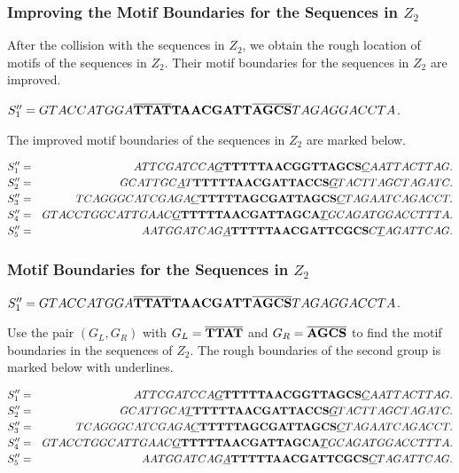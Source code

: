 \documentclass[11pt]{article}
\begin{document}
\subsubsection{Improving the Motif Boundaries for the Sequences in $Z_2$}

After the collision with the sequences in $Z_2$, we obtain the rough
location of motifs of the sequences in $Z_2$. Their motif boundaries
for the sequences in $Z_2$ are improved.

$S_1''=GTACCATGGA{\Large\bf \overline{TTAT}T
AACGATT\overline{AGCS}}TAGAGGACCTA$.

The improved motif boundaries of the sequences in $Z_2$ are marked
below.

\begin{eqnarray*}
S_1''&=&ATTCGATCCA\underline{G}{\Large\bf
TTTTTAACG{\small{G}}TTAGCS}\underline{C}AATTACTTAG.\\
S_2''&=&GCATTGC\underline{A}T{\Large\bf
TTTTTAACGATTACCS}\underline{G}TACTTAGCTAGATC.\\
S_3''&=&TCAGGGCATCGAGA\underline{C}{\Large\bf TTTTTAGCGATTAGCS}\underline{C}TAGAATCAGACCT.\\
S_4''&=&GTACCTGGCATTGAAC\underline{G}{\Large\bf TTTTTAACGATTAGCA}\underline{T}GCAGATGGACCTTTA.\\
S_5''&=&AATGGATCAG\underline{A}{\Large\bf
TTTTTAACGATTCGCS}C\underline{T}AGATTCAG.
\end{eqnarray*}

\subsubsection{Motif Boundaries for the Sequences in $Z_2$}

$S_1''=GTACCATGGA{\Large\bf \overline{TTAT}T
AACGATT\overline{AGCS}}TAGAGGACCTA$.

Use the pair $(G_L,G_R)$ with $G_L={\Large\bf \overline{TTAT}}$ and
$G_R={\Large\bf\overline{AGCS}}$ to find the motif boundaries in the
sequences of $Z_2$. The rough boundaries of the second group is
marked below with underlines.





\begin{eqnarray*}
S_1''&=&ATTCGATCCA\underline{G}{\Large\bf
TTTTTAACG{\small{G}}TTAGCS}\underline{C}AATTACTTAG.\\
S_2''&=&GCATTGCA\underline{T}{\Large\bf
TTTTTAACGATTACCS}\underline{G}TACTTAGCTAGATC.\\
S_3''&=&TCAGGGCATCGAGA\underline{C}{\Large\bf TTTTTAGCGATTAGCS}\underline{C}TAGAATCAGACCT.\\
S_4''&=&GTACCTGGCATTGAAC\underline{G}{\Large\bf TTTTTAACGATTAGCA}\underline{T}GCAGATGGACCTTTA.\\
S_5''&=&AATGGATCAG\underline{A}{\Large\bf
TTTTTAACGATTCGCS}\underline{C}TAGATTCAG.
\end{eqnarray*}
\end{document}
